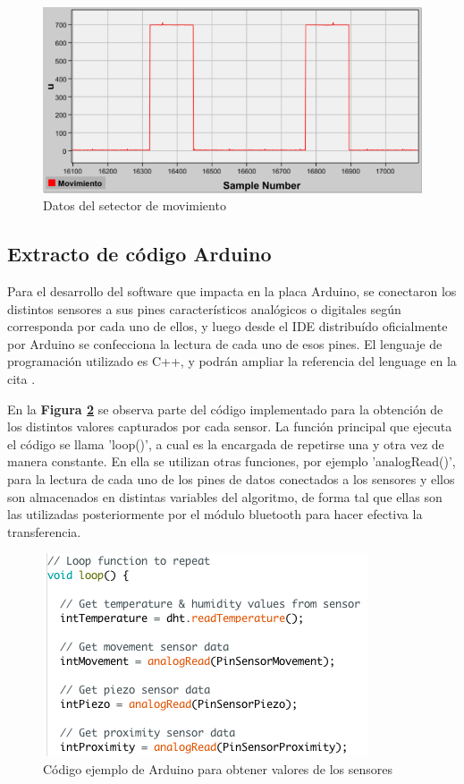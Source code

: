 \documentclass{IEEEtran}
\begin{document}
				\begin{figure}
					\centering
					\includegraphics[width=1\linewidth]{movimiento}
					\caption{Datos del setector de movimiento}
					\label{movimiento}
				\end{figure}

		\subsection{Extracto de código Arduino}
			
			Para el desarrollo del software que impacta en la placa Arduino, se conectaron los distintos sensores a sus pines característicos analógicos o digitales según corresponda por cada uno de ellos, y luego desde el IDE distribuído oficialmente por Arduino se confecciona la lectura de cada uno de esos pines. El lenguaje de programación utilizado es C++, y podrán ampliar la referencia del lenguage en la cita \cite{arduinocode}. 

			En la \textbf{Figura \ref{codigo-arduino-1}} se observa parte del código implementado para la obtención de los distintos valores capturados por cada sensor. La función principal que ejecuta el código se llama 'loop()', a cual es la encargada de repetirse una y otra vez de manera constante. En ella se utilizan otras funciones, por ejemplo 'analogRead()', para la lectura de cada uno de los pines de datos conectados a los sensores y ellos son almacenados en distintas variables del algoritmo, de forma tal que ellas son las utilizadas posteriormente por el módulo bluetooth para hacer efectiva la transferencia.

			\begin{figure}
				\centering
				\includegraphics[width=0.8\linewidth]{codigo-arduino-1}
				\caption{Código ejemplo de Arduino para obtener valores de los sensores}
				\label{codigo-arduino-1}
			\end{figure}
			
\end{document}

